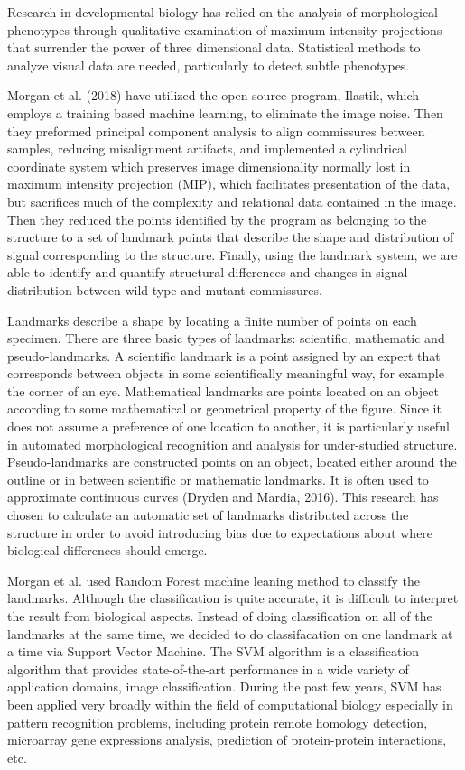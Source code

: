 \documentclass[10pt,letterpaper]{article}
\begin{document}
Research in developmental biology has relied on the analysis of
morphological phenotypes through qualitative examination of maximum
intensity projections that surrender the power of three dimensional
data. Statistical methods to analyze visual data are needed,
particularly to detect subtle phenotypes.

Morgan et al. (2018) have utilized the open source program, Ilastik,
which employs a training based machine learning, to eliminate the image
noise. Then they preformed principal component analysis to align
commissures between samples, reducing misalignment artifacts, and
implemented a cylindrical coordinate system which preserves image
dimensionality normally lost in maximum intensity projection (MIP),
which facilitates presentation of the data, but sacrifices much of the
complexity and relational data contained in the image. Then they reduced
the points identified by the program as belonging to the structure to a
set of landmark points that describe the shape and distribution of
signal corresponding to the structure. Finally, using the landmark
system, we are able to identify and quantify structural differences and
changes in signal distribution between wild type and mutant commissures.

Landmarks describe a shape by locating a finite number of points on each
specimen. There are three basic types of landmarks: scientific,
mathematic and pseudo-landmarks. A scientific landmark is a point
assigned by an expert that corresponds between objects in some
scientifically meaningful way, for example the corner of an eye.
Mathematical landmarks are points located on an object according to some
mathematical or geometrical property of the figure. Since it does not
assume a preference of one location to another, it is particularly
useful in automated morphological recognition and analysis for
under-studied structure. Pseudo-landmarks are constructed points on an
object, located either around the outline or in between scientific or
mathematic landmarks. It is often used to approximate continuous curves
(Dryden and Mardia, 2016). This research has chosen to calculate an
automatic set of landmarks distributed across the structure in order to
avoid introducing bias due to expectations about where biological
differences should emerge.

Morgan et al. used Random Forest machine leaning method to classify the
landmarks. Although the classification is quite accurate, it is
difficult to interpret the result from biological aspects. Instead of
doing classification on all of the landmarks at the same time, we
decided to do classifacation on one landmark at a time via Support
Vector Machine. The SVM algorithm is a classification algorithm that
provides state-of-the-art performance in a wide variety of application
domains, image classification. During the past few years, SVM has been
applied very broadly within the field of computational biology
especially in pattern recognition problems, including protein remote
homology detection, microarray gene expressions analysis, prediction of
protein-protein interactions, etc.
\end{document}
